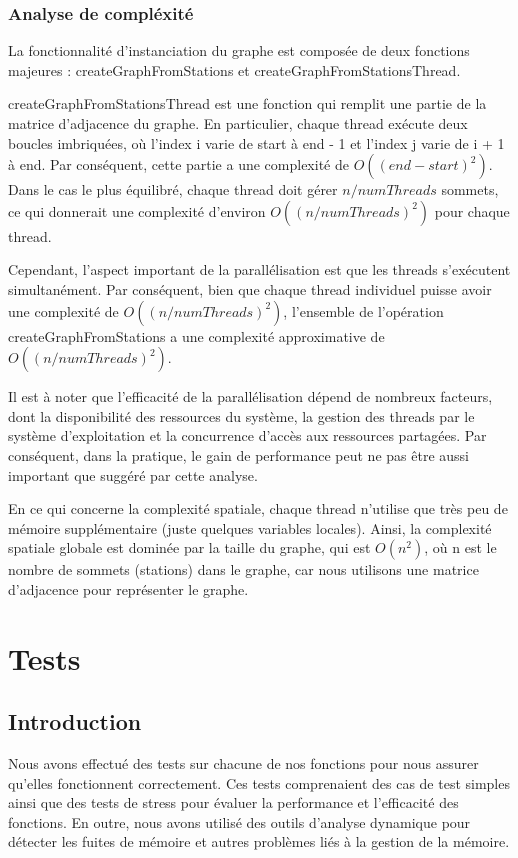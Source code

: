 \documentclass[french,a4paper]{article}
\begin{document}
\subsubsection{Analyse de compléxité}
La fonctionnalité d'instanciation du graphe est composée de deux fonctions majeures : createGraphFromStations et createGraphFromStationsThread.

createGraphFromStationsThread est une fonction qui remplit une partie de la matrice d'adjacence du graphe. En particulier, chaque thread exécute deux boucles imbriquées, où l'index i varie de start à end - 1 et l'index j varie de i + 1 à end. Par conséquent, cette partie a une complexité de $O((end-start)^2)$. Dans le cas le plus équilibré, chaque thread doit gérer $n / numThreads$ sommets, ce qui donnerait une complexité d'environ $O((n / numThreads)^2)$ pour chaque thread.

Cependant, l'aspect important de la parallélisation est que les threads s'exécutent simultanément. Par conséquent, bien que chaque thread individuel puisse avoir une complexité de $O((n / numThreads)^2)$, l'ensemble de l'opération createGraphFromStations a une complexité approximative de $O((n / numThreads)^2)$.

Il est à noter que l'efficacité de la parallélisation dépend de nombreux facteurs, dont la disponibilité des ressources du système, la gestion des threads par le système d'exploitation et la concurrence d'accès aux ressources partagées. Par conséquent, dans la pratique, le gain de performance peut ne pas être aussi important que suggéré par cette analyse.

En ce qui concerne la complexité spatiale, chaque thread n'utilise que très peu de mémoire supplémentaire (juste quelques variables locales). Ainsi, la complexité spatiale globale est dominée par la taille du graphe, qui est $O(n^2)$, où n est le nombre de sommets (stations) dans le graphe, car nous utilisons une matrice d'adjacence pour représenter le graphe.


\section{Tests}

\subsection{Introduction}
Nous avons effectué des tests sur chacune de nos fonctions pour nous assurer qu'elles fonctionnent correctement. Ces tests comprenaient des cas de test simples ainsi que des tests de stress pour évaluer la performance et l'efficacité des fonctions. En outre, nous avons utilisé des outils d'analyse dynamique pour détecter les fuites de mémoire et autres problèmes liés à la gestion de la mémoire.
\end{document}
